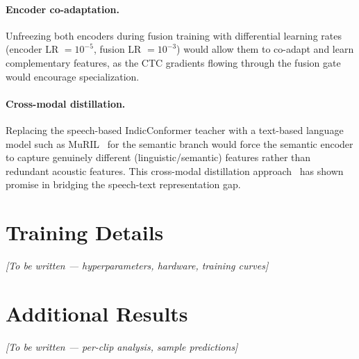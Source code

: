 \documentclass{article} %
\begin{document}
\paragraph{Encoder co-adaptation.} Unfreezing both encoders during fusion training with differential learning rates (encoder LR $= 10^{-5}$, fusion LR $= 10^{-3}$) would allow them to co-adapt and learn complementary features, as the CTC gradients flowing through the fusion gate would encourage specialization.

\paragraph{Cross-modal distillation.} Replacing the speech-based IndicConformer teacher with a text-based language model such as MuRIL~\citep{khanuja2021muril} for the semantic branch would force the semantic encoder to capture genuinely different (linguistic/semantic) features rather than redundant acoustic features. This cross-modal distillation approach~\citep{bapna2022slam, ao2022speecht5} has shown promise in bridging the speech-text representation gap.




\appendix
\section{Training Details}
\label{app:training}

\textit{[To be written --- hyperparameters, hardware, training curves]}

\section{Additional Results}
\label{app:results}

\textit{[To be written --- per-clip analysis, sample predictions]}
\end{document}
